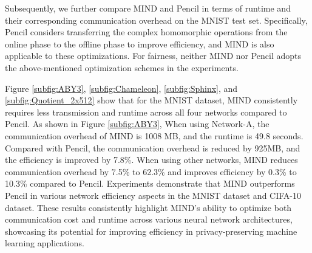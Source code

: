 \documentclass[conference]{IEEEtran}
\begin{document}




Subsequently, we further compare MIND and Pencil \cite{liu2024pencilprivateextensiblecollaborative}  in terms of runtime and their corresponding communication overhead on the MNIST test set.
Specifically, Pencil considers transferring the complex homomorphic operations from the online phase to the offline phase to improve efficiency, and MIND is also applicable to these optimizations.
For fairness, neither MIND nor Pencil adopts the above-mentioned optimization schemes in the experiments.






 



Figure \ref{subfig:ABY3}, \ref{subfig:Chameleon}, \ref{subfig:Sphinx}, and \ref{subfig:Quotient_2x512} show that for the MNIST dataset, MIND consistently requires less transmission and runtime across all four networks compared to Pencil.
As shown in Figure \ref{subfig:ABY3}, When using Network-A, the communication overhead of MIND is 1008 MB, and the runtime is 49.8 seconds. Compared with Pencil, the communication overhead is reduced by 925MB, and the efficiency is improved by 7.8\%. When using other networks, MIND reduces communication overhead by 7.5\% to 62.3\% and improves efficiency by 0.3\% to 10.3\% compared to Pencil. Experiments demonstrate that MIND outperforms Pencil in various network efficiency aspects in the MNIST dataset and CIFA-10 dataset. These results consistently highlight MIND's ability to optimize both communication cost and runtime across various neural network architectures, showcasing its potential for improving efficiency in privacy-preserving machine learning applications.
\end{document}
